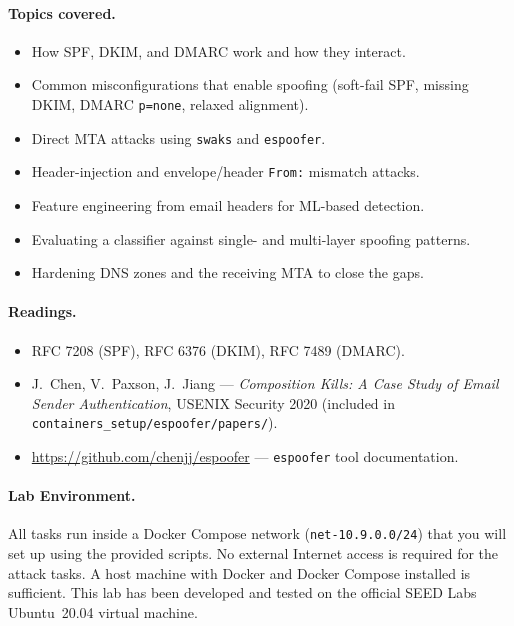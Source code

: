 \documentclass[11pt]{article}
\begin{document}
\paragraph{Topics covered.}
\begin{itemize}[noitemsep]
  \item How SPF, DKIM, and DMARC work and how they interact.
  \item Common misconfigurations that enable spoofing (soft-fail SPF,
    missing DKIM, DMARC \texttt{p=none}, relaxed alignment).
  \item Direct MTA attacks using \texttt{swaks} and \texttt{espoofer}.
  \item Header-injection and envelope/header \texttt{From:} mismatch
    attacks.
  \item Feature engineering from email headers for ML-based detection.
  \item Evaluating a classifier against single- and multi-layer
    spoofing patterns.
  \item Hardening DNS zones and the receiving MTA to close the gaps.
\end{itemize}

\paragraph{Readings.}
\begin{itemize}[noitemsep]
  \item RFC 7208 (SPF), RFC 6376 (DKIM), RFC 7489 (DMARC).
  \item J.\ Chen, V.\ Paxson, J.\ Jiang ---
    \textit{Composition Kills: A Case Study of Email Sender
    Authentication}, USENIX Security 2020
    (included in \texttt{containers\_setup/espoofer/papers/}).
  \item \url{https://github.com/chenjj/espoofer} --- \texttt{espoofer} tool
    documentation.
\end{itemize}

\paragraph{Lab Environment.}
All tasks run inside a Docker Compose network (\texttt{net-10.9.0.0/24})
that you will set up using the provided scripts.
No external Internet access is required for the attack tasks.
A host machine with Docker and Docker Compose installed is sufficient.
This lab has been developed and tested on the official SEED Labs
Ubuntu~20.04 virtual machine.
\end{document}
